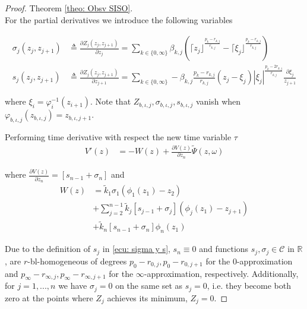 \documentclass[11pt,letterpaper,twoside,openright]{report}
\newcommand{\RE}{\mathbb{R}}
\newcommand{\sig}[2]{\lceil#1\rfloor^{#2}}
\newcommand{\abs}[2]{|#1|^{#2}}
\begin{document}
\begin{proof}{Theorem \ref{theo: Obsv SISO}. \\}
	For the partial derivatives we introduce the following variables
	\begin{small}
		\begin{equation}\label{ecu: sigma y s}
		\begin{split}
			\sigma_{j}(z_j,z_{j+1}) &\triangleq \frac{\partial Z_{j}(z_{j},z_{j+1})}{\partial z_{j}} = \displaystyle\sum_{k\in \{0,\infty\}}^{} \beta_{k,j} \left(
			 \sig{z_{j}}{\frac{p_{k}-r_{k,j}}{r_{k,j}}} - \sig{\xi_{j}}{\frac{p_{k}-r_{k,j}}{r_{k,j}}}    \right)\\
			s_{j}(z_j,z_{j+1})&\triangleq \frac{\partial Z_{j}(z_{j},z_{j+1})}{\partial z_{j+1}} = \displaystyle\sum_{k\in \{0,\infty\}}^{} 
			-\beta_{k,j}\frac{p_k-r_{k,j}}{r_{k,j}}(z_{j}-\xi_{j})\abs{\xi_{j}}{\frac{p_k-2r_{k,j}}{r_{k,j}}} \frac{\partial \xi_{j}}{z_{j+1}}
		\end{split}
		\end{equation}
	\end{small}
	
	where $\xi_i=\varphi_{i}^{-1}(z_{i+1})$. Note that $Z_{b,\iota,j},\sigma_{b,\iota,j},s_{b,\iota,j}$ vanish when $\varphi_{b,\iota,j}(z_{b,\iota,j})=z_{b,\iota,j+1}$.
	
	Performing time derivative with respect the new time variable $\tau$
	\begin{equation}\label{ecu: Vprima SISO}
		\begin{split}
			V'(z) & = -W(z) + \frac{\partial V(z)}{\partial z_{n}}\tilde{\Psi}(z,\omega)
		\end{split}
	\end{equation}
	
	where $\frac{\partial V(z)}{\partial z_{n}} = [s_{n-1} + \sigma_{n}]$ and
	\begin{equation}\label{ecu : W siso}
		\begin{split}
			W(z) &= \tilde{k}_1\sigma_1(\phi_1(z_1)-z_2) \\
			& + \displaystyle\sum_{j=2}^{n-1} \tilde{k}_j \left[ s_{j-1}+\sigma_j \right] (\phi_j(z_1) - z_{j+1}) \\
			& + \tilde{k}_n \left[ s_{n-1} + \sigma_n \right] \phi_n(z_1)
		\end{split}
	\end{equation}
	  	
 	Due to the definition of $s_j$ in \eqref{ecu: sigma y s}, $s_n\equiv 0$ and functions $s_j,\sigma_j \in \mathcal{C}$ in $\RE$, are $r$-bl-homogeneous of degrees $p_0-r_{0,j},p_0-r_{0,j+1}$ for the 0-approximation and $p_{\infty}-r_{\infty,j},p_{\infty}-r_{\infty,j+1}$ for the $\infty$-approximation, respectively. Additionally, for $j=1,...,n$ we have $\sigma_j=0$ on the same set as $s_j=0$, i.e. they become both zero at the points where $Z_{j}$ achieves its minimum, $Z_j=0$.
 	

\end{proof}
\end{document}
